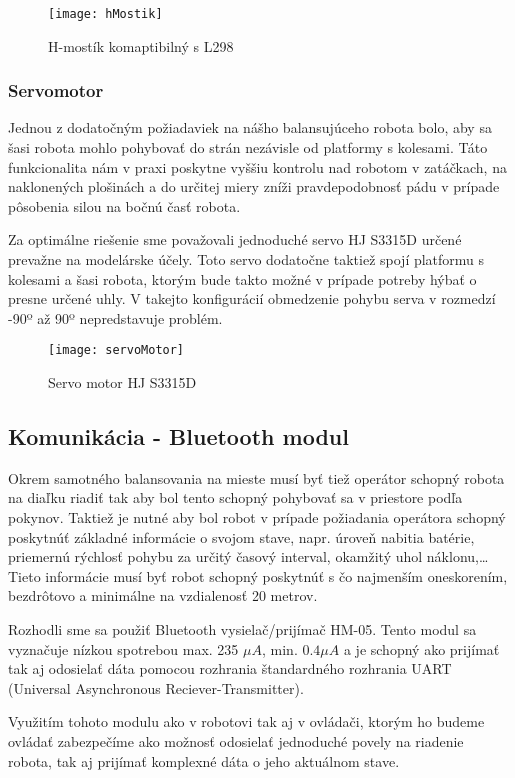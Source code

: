 \begin{figure}
\centering
\texttt{[image: hMostik]}
\caption{H-mostík komaptibilný s L298}
\label{fig:hMostik}
\end{figure}

\subsubsection{Servomotor}
Jednou z dodatočným požiadaviek na nášho balansujúceho robota bolo, aby sa šasi robota mohlo pohybovať do strán nezávisle od platformy s kolesami. Táto funkcionalita nám v praxi poskytne vyššiu kontrolu nad robotom v zatáčkach, na naklonených plošinách a do určitej miery zníži pravdepodobnosť pádu v prípade pôsobenia silou na bočnú časť robota.

Za optimálne riešenie sme považovali jednoduché servo HJ S3315D určené prevažne na modelárske účely. Toto servo dodatočne taktiež spojí platformu s kolesami a šasi robota, ktorým bude takto možné v prípade potreby hýbať o presne určené uhly. V takejto konfigurácií  obmedzenie pohybu serva v rozmedzí -90º až 90º nepredstavuje problém.


\begin{figure}[h]
\centering
\texttt{[image: servoMotor]}
\caption{Servo motor HJ S3315D}
\label{fig:servoMotor}
\end{figure}
\subsection{Komunikácia - Bluetooth modul}
Okrem samotného balansovania na mieste musí byť tiež operátor schopný robota na diaľku riadiť tak aby bol tento schopný pohybovať sa v priestore podľa pokynov. Taktiež je nutné aby bol robot v prípade požiadania operátora schopný poskytnúť základné informácie o svojom stave, napr. úroveň nabitia batérie, priemernú rýchlosť pohybu za určitý časový interval, okamžitý uhol náklonu,… Tieto informácie musí byť robot schopný poskytnúť s čo najmenším oneskorením, bezdrôtovo a minimálne na vzdialenosť 20 metrov.  

Rozhodli sme sa použiť Bluetooth vysielač/prijímač HM-05. Tento modul sa vyznačuje nízkou spotrebou max. 235 $\mu A$, min. $0.4\mu A$ a je schopný ako prijímať tak aj odosielať dáta pomocou rozhrania štandardného rozhrania UART (Universal Asynchronous Reciever-Transmitter). 

Využitím tohoto modulu ako v robotovi tak aj v ovládači, ktorým ho budeme ovládať zabezpečíme ako možnosť odosielať jednoduché povely na riadenie robota, tak aj prijímať komplexné dáta o jeho aktuálnom stave.

